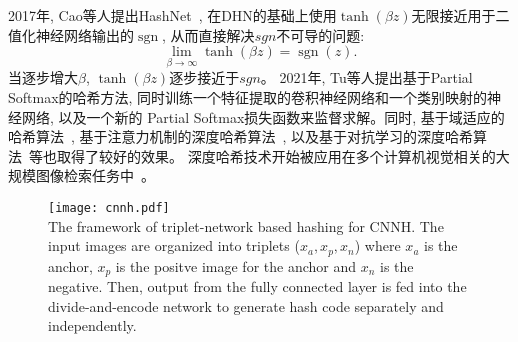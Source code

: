 2017年, Cao等人提出HashNet~\cite{cao2017hashnet},  在DHN的基础上使用$\operatorname{tanh}(\beta z)$无限接近用于二值化神经网络输出的$\operatorname{sgn}$, 从而直接解决$sgn$不可导的问题:
\begin{equation}
    \lim _{\beta \rightarrow \infty} \tanh (\beta z)=\operatorname{sgn}(z).
\end{equation}
当逐步增大$\beta$, $\operatorname{tanh}(\beta z)$逐步接近于$sgn$。
2021年, Tu等人提出基于Partial Softmax的哈希方法, 同时训练一个特征提取的卷积神经网络和一个类别映射的神经网络, 以及一个新的 Partial Softmax损失函数来监督求解。同时, 基于域适应的哈希算法~\cite{fyw2018}, 基于注意力机制的深度哈希算法~\cite{jhj2021,cg2020}, 以及基于对抗学习的深度哈希算法~\cite{yr2021}等也取得了较好的效果。 深度哈希技术开始被应用在多个计算机视觉相关的大规模图像检索任务中~\cite{csg2020,qh2018, lijuannan}。
\begin{figure}[!htp]
    \centering
    \texttt{[image: cnnh.pdf]} \\
      {The framework of triplet-network based hashing for CNNH. The input images are organized into triplets ($x_a, x_p, x_n$) where $x_a$ is the anchor, $x_p$ is the positve image for the anchor and $x_n$ is the negative. Then, output from the fully connected layer  is fed into the divide-and-encode network to generate hash code separately and independently.}
   \label{fig:trihash}
\end{figure}
